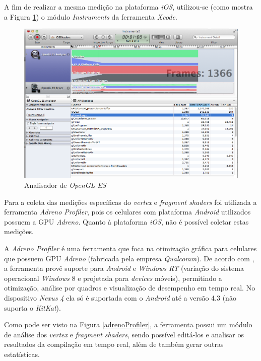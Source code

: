 	A fim de realizar a mesma medição na plataforma \textit{iOS}, utilizou-se (como mostra a Figura \ref{instruments}) o módulo \textit{Instruments} da ferramenta \textit{Xcode}.

	\begin{figure}[ht]
	\centering
		\includegraphics[keepaspectratio=true,scale=0.3]{figuras/analyzer_opengles.png}
	\caption{Analisador de \textit{OpenGL ES}}
	\label{instruments}
	\end{figure}


	Para a coleta das medições específicas do \textit{vertex} e \textit{fragment shaders} foi utilizada a ferramenta \textit{Adreno Profiler}, pois os celulares com plataforma \textit{Android} utilizados possuem a GPU \textit{Adreno}. Quanto à plataforma \textit{iOS}, não é possível coletar estas medições. 

	A \textit{Adreno Profiler} é uma ferramenta que foca na otimização gráfica para celulares que possuem GPU \textit{Adreno} (fabricada pela empresa \textit{Qualcomm}). De acordo com  \cite{adp}, a ferramenta provê suporte para \textit{Android} e \textit{Windows RT} (variação do sistema operacional \textit{Windows} 8  e projetada para \textit{devices} móveis), permitindo a otimização, análise por quadros e visualização de desempenho em tempo real. No dispositivo \textit{Nexus 4} ela só é suportada com o \textit{Android} até a versão 4.3 (não suporta o \textit{KitKat}).

	Como pode ser visto na Figura \ref{adrenoProfiler}, a ferramenta possui um módulo de análise dos \textit{vertex} e \textit{fragment} \textit{shaders}, sendo possível editá-los e analisar os resultados da compilação em tempo real, além de também gerar outras estatísticas.  

